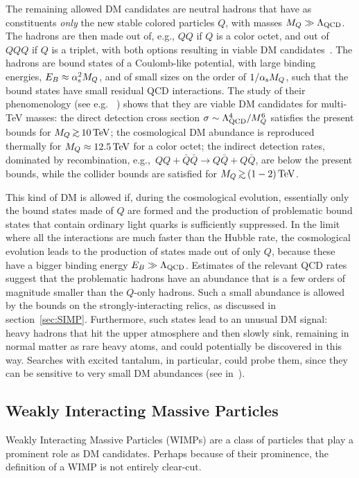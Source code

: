 The remaining allowed DM candidates are 
neutral hadrons that have as constituents {\em only} the new stable colored particles $Q$, 
with masses $M_Q\gg \Lambda_{\rm QCD}$.
The hadrons are then made out of, e.g., $QQ$ if $Q$ is a color octet, and out of $QQQ$ if $Q$ is a triplet, with both options resulting in
viable DM candidates~\cite{coloredDM}. 
The hadrons are  bound states of a Coulomb-like potential,
with large binding energies, $E_B \approx \alpha_{\rm s}^2 M_Q$, and of small sizes on the order of $1/\alpha_{\rm s} M_Q$,
such that the bound states have small residual QCD interactions.
The study of their phenomenology (see e.g.~ \cite{coloredDM}) shows that they are viable DM candidates for multi-TeV masses:
the  direct detection cross section $\sigma \sim \Lambda_{\rm QCD}^4/M_Q^6$ satisfies
the present bounds for $M_Q\circa{>}10\TeV$;
the cosmological DM abundance is reproduced thermally for $M_Q \approx 12.5\,{\rm TeV}$ for a color octet;
the indirect detection rates, dominated by recombination, e.g.,\ $QQ+\bar Q\bar Q \to Q\bar Q+Q\bar Q$, are below the present bounds, while
the collider bounds are satisfied for $M_Q\circa{>}(1-2)\TeV$.


This kind of DM is allowed if, during the cosmological evolution, essentially only the bound states made of $Q$ are formed and the production of problematic bound states that contain ordinary light quarks is sufficiently suppressed.
In the limit where all the interactions are much faster  than the Hubble rate,
the cosmological evolution leads to the production of states made out of only $Q$, because these have a bigger binding energy
$E_B \gg \Lambda_{\rm QCD}$.
Estimates of the relevant QCD rates suggest that the problematic
hadrons have an abundance that is a few orders of magnitude smaller than
the $Q$-only hadrons.
Such a small abundance is allowed by the bounds on the strongly-interacting
relics, as discussed in section~\ref{sec:SIMP}.
Furthermore, such states lead to an unusual DM signal: 
heavy hadrons that hit the upper atmosphere and then slowly sink, remaining
in normal matter as rare heavy atoms, and could potentially be discovered in this way.
Searches with excited tantalum, in particular, could probe them, since they can be sensitive to very small DM abundances (see  in~\cite{SIMP}).


\subsection{Weakly Interacting Massive Particles}\label{sec:WIMPs}
Weakly Interacting Massive Particles (WIMPs) are a class of particles that play a prominent role as DM candidates. 
Perhaps because of their prominence, the definition of a WIMP is not entirely clear-cut.



